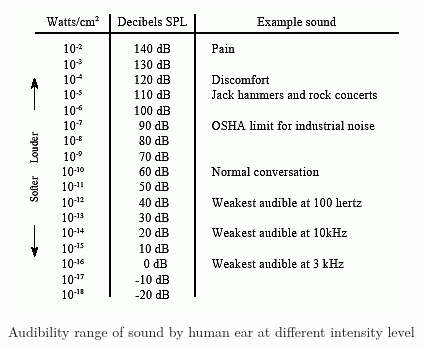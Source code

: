 \begin{figure}[h]
	\begin{center}
		\includegraphics[scale=0.8]{images/intensity.png}
		\caption{Audibility range of sound by human ear at different 
			intensity level}
	\end{center}
\end{figure}

